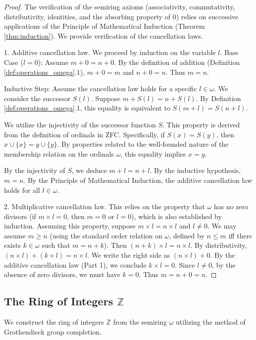 \documentclass[11pt, a4paper]{article}
\theoremstyle{plain}
\theoremstyle{definition}
\numberwithin{equation}{section}
\newcommand{\Z}{\mathbb{Z}}
\begin{document}
\begin{proof}
The verification of the semiring axioms (associativity, commutativity, distributivity, identities, and the absorbing property of 0) relies on successive applications of the Principle of Mathematical Induction (Theorem \ref{thm:induction}). We provide verification of the cancellation laws.

1. Additive cancellation law. We proceed by induction on the variable $l$.
Base Case ($l=0$): Assume $m+0 = n+0$. By the definition of addition (Definition \ref{def:operations_omega}.1), $m+0=m$ and $n+0=n$. Thus $m=n$.

Inductive Step: Assume the cancellation law holds for a specific $l \in \omega$. We consider the successor $S(l)$.
Suppose $m+S(l) = n+S(l)$. By Definition \ref{def:operations_omega}.1, this equality is equivalent to $S(m+l) = S(n+l)$.

We utilize the injectivity of the successor function $S$. This property is derived from the definition of ordinals in ZFC. Specifically, if $S(x)=S(y)$, then $x \cup \{x\} = y \cup \{y\}$. By properties related to the well-founded nature of the membership relation on the ordinals $\omega$, this equality implies $x=y$.

By the injectivity of $S$, we deduce $m+l = n+l$.
By the inductive hypothesis, $m=n$.
By the Principle of Mathematical Induction, the additive cancellation law holds for all $l \in \omega$.

2. Multiplicative cancellation law. This relies on the property that $\omega$ has no zero divisors (if $m\times l = 0$, then $m=0$ or $l=0$), which is also established by induction.
Assuming this property, suppose $m\times l = n\times l$ and $l\neq 0$. We may assume $m \ge n$ (using the standard order relation on $\omega$, defined by $n \le m$ iff there exists $k \in \omega$ such that $m=n+k$).
Then $(n+k)\times l = n\times l$. By distributivity, $(n\times l) + (k\times l) = n\times l$.
We write the right side as $(n\times l) + 0$.
By the additive cancellation law (Part 1), we conclude $k\times l = 0$. Since $l\neq 0$, by the absence of zero divisors, we must have $k=0$. Thus $m=n+0=n$.
\end{proof}

\subsection{The Ring of Integers $\Z$}

We construct the ring of integers $\Z$ from the semiring $\omega$ utilizing the method of Grothendieck group completion.
\end{document}

